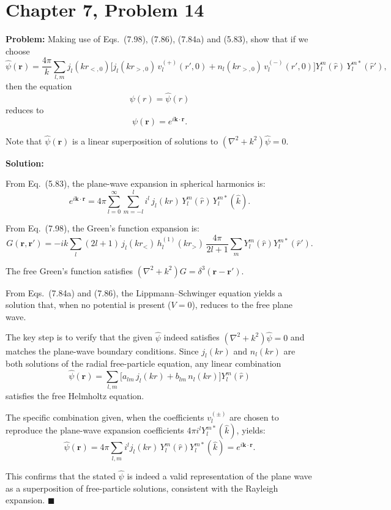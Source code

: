 \documentclass[12pt]{article}
\begin{document}
\section*{Chapter 7, Problem 14}

\textbf{Problem:} Making use of Eqs.\ (7.98), (7.86), (7.84a) and (5.83), show that if we choose
\[
\hat{\psi}(\mathbf{r}) = \frac{4\pi}{k}\sum_{l,m} j_l(kr_{<,0})\bigl[j_l(kr_{>,0})\,v_l^{(+)}(r',0)+n_l(kr_{>,0})\,v_l^{(-)}(r',0)\bigr]Y_l^m(\hat{r})\,Y_l^{m*}(\hat{r}'),
\]
then the equation
\[
\psi(r) = \hat{\psi}(r)
\]
reduces to
\[
\psi(\mathbf{r}) = e^{i\mathbf{k}\cdot\mathbf{r}}.
\]

Note that $\hat{\psi}(\mathbf{r})$ is a linear superposition of solutions to $(\nabla^2 + k^2)\hat\psi = 0$.

\bigskip
\textbf{Solution:}

From Eq.\ (5.83), the plane-wave expansion in spherical harmonics is:
\[
e^{i\mathbf{k}\cdot\mathbf{r}} = 4\pi\sum_{l=0}^{\infty}\sum_{m=-l}^{l} i^l\,j_l(kr)\,Y_l^m(\hat{r})\,Y_l^{m*}(\hat{k}).
\]

From Eq.\ (7.98), the Green's function expansion is:
\[
G(\mathbf{r},\mathbf{r}') = -ik\sum_l (2l+1)\,j_l(kr_<)\,h_l^{(1)}(kr_>)\,\frac{4\pi}{2l+1}\sum_m Y_l^m(\hat{r})Y_l^{m*}(\hat{r}').
\]

The free Green's function satisfies $(\nabla^2 + k^2)G = \delta^3(\mathbf{r}-\mathbf{r}')$.

From Eqs.\ (7.84a) and (7.86), the Lippmann--Schwinger equation yields a solution that, when no potential is present ($V = 0$), reduces to the free plane wave.

The key step is to verify that the given $\hat{\psi}$ indeed satisfies $(\nabla^2 + k^2)\hat\psi = 0$ and matches the plane-wave boundary conditions. Since $j_l(kr)$ and $n_l(kr)$ are both solutions of the radial free-particle equation, any linear combination
\[
\hat\psi(\mathbf{r}) = \sum_{l,m} \bigl[a_{lm}\,j_l(kr) + b_{lm}\,n_l(kr)\bigr]Y_l^m(\hat{r})
\]
satisfies the free Helmholtz equation.

The specific combination given, when the coefficients $v_l^{(\pm)}$ are chosen to reproduce the plane-wave expansion coefficients $4\pi i^l Y_l^{m*}(\hat{k})$, yields:
\[
\hat\psi(\mathbf{r}) = 4\pi\sum_{l,m} i^l j_l(kr)\,Y_l^m(\hat{r})Y_l^{m*}(\hat{k}) = e^{i\mathbf{k}\cdot\mathbf{r}}.
\]

This confirms that the stated $\hat\psi$ is indeed a valid representation of the plane wave as a superposition of free-particle solutions, consistent with the Rayleigh expansion. $\blacksquare$
\end{document}
